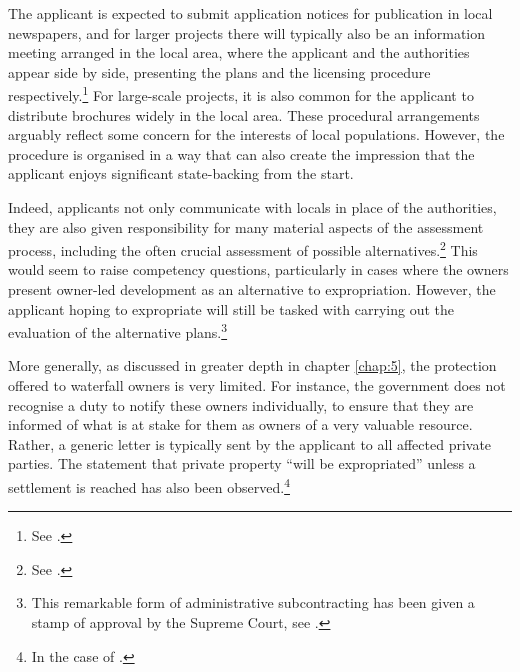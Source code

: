 
The applicant is expected to submit application notices for publication in local newspapers, and for larger projects there will typically also be an information meeting arranged in the local area, where the applicant and the authorities appear side by side, presenting the plans and the licensing procedure respectively.\footnote{See \cite[23]{stokker10}.} For large-scale projects, it is also common for the applicant to distribute brochures widely in the local area. These procedural arrangements arguably reflect some concern for the interests of local populations. However, the procedure is organised in a way that can also create the impression that the applicant enjoys significant state-backing from the start.

Indeed, applicants not only communicate with locals in place of the authorities, they are also given responsibility for many material aspects of the assessment process, including the often crucial assessment of possible alternatives.\footnote{See \cite[24]{stokker10}.} This would seem to raise competency questions, particularly in cases where the owners  present owner-led development as an alternative to expropriation. However, the applicant hoping to expropriate will still be tasked with carrying out the evaluation of the alternative plans.\footnote{This remarkable form of administrative subcontracting has been given a stamp of approval by the Supreme Court, see \cite[51-55]{jorpeland11}.}

More generally, as discussed in greater depth in chapter \ref{chap:5}, the protection offered to waterfall owners is very limited. For instance, the government does not recognise a duty to notify these owners individually, to ensure that they are informed of what is at stake for them as owners of a very valuable resource. Rather, a generic letter is typically sent by the applicant to all affected private parties. The statement that private property ``will be expropriated'' unless a settlement is reached has also been observed.\footnote{In the case of \cite{sauda09}.}

